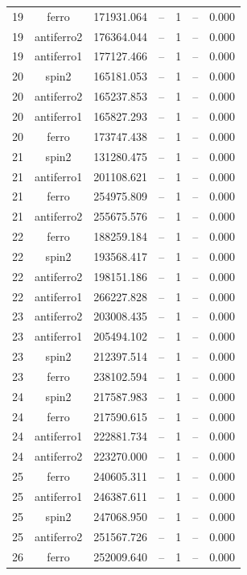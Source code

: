 \begin{longtable}{@{}ccrrrrr@{}}
19 & ferro & 171931.064 & -- & 1 & -- & 0.000 \\
19 & antiferro2 & 176364.044 & -- & 1 & -- & 0.000 \\
19 & antiferro1 & 177127.466 & -- & 1 & -- & 0.000 \\
\rowcolor{gray!20} 20 & spin2 & 165181.053 & -- & 1 & -- & 0.000 \\
20 & antiferro2 & 165237.853 & -- & 1 & -- & 0.000 \\
20 & antiferro1 & 165827.293 & -- & 1 & -- & 0.000 \\
20 & ferro & 173747.438 & -- & 1 & -- & 0.000 \\
\rowcolor{gray!20} 21 & spin2 & 131280.475 & -- & 1 & -- & 0.000 \\
21 & antiferro1 & 201108.621 & -- & 1 & -- & 0.000 \\
21 & ferro & 254975.809 & -- & 1 & -- & 0.000 \\
21 & antiferro2 & 255675.576 & -- & 1 & -- & 0.000 \\
\rowcolor{gray!20} 22 & ferro & 188259.184 & -- & 1 & -- & 0.000 \\
22 & spin2 & 193568.417 & -- & 1 & -- & 0.000 \\
22 & antiferro2 & 198151.186 & -- & 1 & -- & 0.000 \\
22 & antiferro1 & 266227.828 & -- & 1 & -- & 0.000 \\
\rowcolor{gray!20} 23 & antiferro2 & 203008.435 & -- & 1 & -- & 0.000 \\
23 & antiferro1 & 205494.102 & -- & 1 & -- & 0.000 \\
23 & spin2 & 212397.514 & -- & 1 & -- & 0.000 \\
23 & ferro & 238102.594 & -- & 1 & -- & 0.000 \\
\rowcolor{gray!20} 24 & spin2 & 217587.983 & -- & 1 & -- & 0.000 \\
24 & ferro & 217590.615 & -- & 1 & -- & 0.000 \\
24 & antiferro1 & 222881.734 & -- & 1 & -- & 0.000 \\
24 & antiferro2 & 223270.000 & -- & 1 & -- & 0.000 \\
\rowcolor{gray!20} 25 & ferro & 240605.311 & -- & 1 & -- & 0.000 \\
25 & antiferro1 & 246387.611 & -- & 1 & -- & 0.000 \\
25 & spin2 & 247068.950 & -- & 1 & -- & 0.000 \\
25 & antiferro2 & 251567.726 & -- & 1 & -- & 0.000 \\
\rowcolor{gray!20} 26 & ferro & 252009.640 & -- & 1 & -- & 0.000 \\

\end{longtable}
